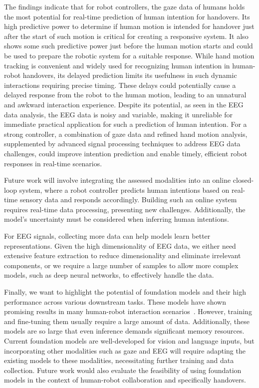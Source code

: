 The findings indicate that for robot controllers, the gaze data of humans holds the most potential for real-time prediction of human intention for handovers. 
Its high predictive power to determine if human motion is intended for handover just after the start of such motion is critical for creating a responsive system. It also shows some such predictive power just before the human motion starts and could be used to prepare the robotic system for a suitable response.
While hand motion tracking is convenient and widely used for recognizing human intention in human-robot handovers, its delayed prediction limits its usefulness in such dynamic interactions requiring precise timing. These delays could potentially cause a delayed response from the robot to the human motion, leading to an unnatural and awkward interaction experience. Despite its potential, as seen in the EEG data analysis, the EEG data is noisy and variable, making it unreliable for immediate practical application for such a prediction of human intention. 
For a strong controller, a combination of gaze data and refined hand motion analysis, supplemented by advanced signal processing techniques to address EEG data challenges, could improve intention prediction and enable timely, efficient robot responses in real-time scenarios.

Future work will involve integrating the assessed modalities into an online closed-loop system, where a robot controller predicts human intentions based on real-time sensory data and responds accordingly. Building such an online system requires real-time data processing, presenting new challenges. Additionally, the model's uncertainty must be considered when inferring human intentions.

For EEG signals, collecting more data can help models learn better representations. Given the high dimensionality of EEG data, we either need extensive feature extraction to reduce dimensionality and eliminate irrelevant components, or we require a large number of samples to allow more complex models, such as deep neural networks, to effectively handle the data.

Finally, we want to highlight the potential of foundation models and their high performance across various downstream tasks. These models have shown promising results in many human-robot interaction scenarios~\cite{min2022rethinking,mahadevan2024generative,lin2023gesture}. However, training and fine-tuning them usually require a large amount of data. Additionally, these models are so large that even inference demands significant memory resources. Current foundation models are well-developed for vision and language inputs, but incorporating other modalities such as gaze and EEG will require adapting the existing models to these modalities, necessitating further training and data collection. Future work would also evaluate the feasibility of using foundation models in the context of human-robot collaboration and specifically handovers.




